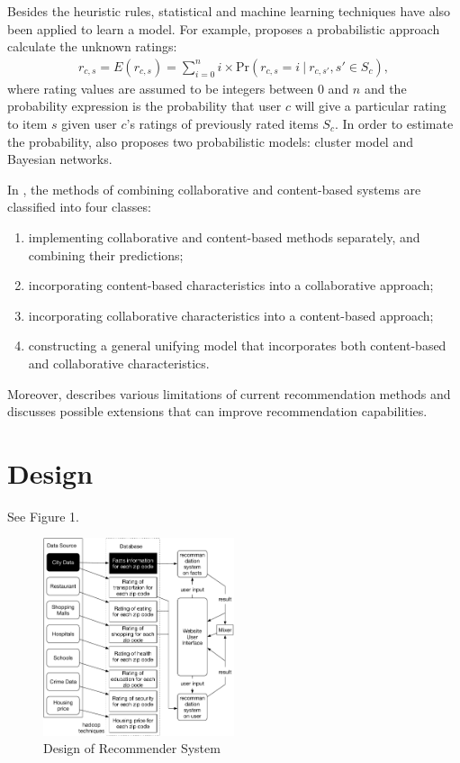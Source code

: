 \documentclass[letterpaper,twocolumn,10pt]{article}
\begin{document}
Besides the heuristic rules,  statistical and machine learning techniques have also  been applied to  learn a model. For example, \cite{BHK98} proposes a probabilistic approach calculate the unknown ratings:
\begin{align} \label{prob}
r_{c, s} = E(r_{c, s}) = \sum_{i=0}^n i\times \text{Pr}(r_{c, s} =i\ |\ r_{c, s'}, s'\in S_c ), 
\end{align}
where rating values are assumed to be integers between  0 and $n$ and the probability expression is the probability that user $c$ will give a particular rating to item $s$ given user $c$'s ratings of previously rated items $S_c$.  In order to estimate  the probability, \cite{BHK98} also proposes two  probabilistic models: cluster model and Bayesian networks.  

In \cite{AT05}, the methods of combining  collaborative and content-based systems are classified into four classes:
\begin{enumerate}
\item implementing collaborative and content-based methods separately, and combining their predictions;
\item incorporating content-based characteristics into a collaborative approach;
\item incorporating collaborative characteristics into a content-based approach;
\item constructing a general unifying model that incorporates both content-based and collaborative characteristics.
\end{enumerate}

Moreover, \cite{AT05}  describes various limitations of current recommendation methods and discusses possible extensions that can improve recommendation capabilities. 

\section{Design}
See Figure 1.

\begin{figure}[h!]\label{fig1}
\begin{center}
\includegraphics[width=0.5\textwidth]{design.pdf}
\end{center}
\caption{ Design of Recommender System}
\end{figure}
\end{document}
